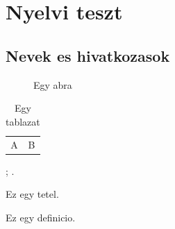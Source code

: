 \documentclass[hu, font = none, mode = simple]{elegantbook-l3}
\begin{document}
\frontmatter
\tableofcontents

\mainmatter
\chapter{Nyelvi teszt}
\section{Nevek es hivatkozasok}

\begin{figure}[htbp]
  \centering
  \fbox{\rule{0pt}{2cm}\rule{3cm}{0pt}}
  \caption{Egy abra}\label{fig:language-test}
\end{figure}

\begin{table}[htbp]
  \centering
  \caption{Egy tablazat}\label{tab:language-test}
  \begin{tabular}{cc}
    A & B
  \end{tabular}
\end{table}

; .

\begin{theorem}[Pelda]
  Ez egy tetel.
\end{theorem}

\begin{definition}
  Ez egy definicio.
\end{definition}
\end{document}
